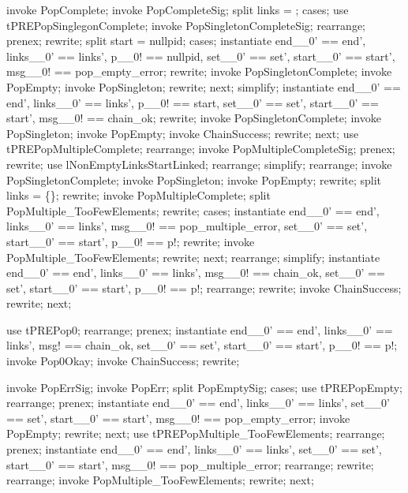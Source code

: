 \begin{forget}[tPREPopCompleteIsTotal]
invoke PopComplete;
invoke PopCompleteSig;
split links = \emptyset;
cases;
use tPREPopSinglegonComplete;
invoke PopSingletonCompleteSig;
rearrange;
prenex;
rewrite;
split start = nullpid;
cases;
instantiate end\_\_0' == end', links\_\_0' == links', p\_\_0! == nullpid, set\_\_0' == set', start\_\_0' == start', msg\_\_0! == pop\_empty\_error;
rewrite;
invoke PopSingletonComplete;
invoke PopEmpty;
invoke PopSingleton;
rewrite;
next;
simplify;
instantiate end\_\_0' == end', links\_\_0' == links', p\_\_0! == start, set\_\_0' == set', start\_\_0' == start', msg\_\_0! == chain\_ok;
rewrite;
invoke PopSingletonComplete;
invoke PopSingleton;
invoke PopEmpty;
invoke ChainSuccess;
rewrite;
next;
use tPREPopMultipleComplete;
rearrange;
invoke PopMultipleCompleteSig;
prenex;
rewrite;
use lNonEmptyLinksStartLinked;
rearrange;
simplify;
rearrange;
invoke PopSingletonComplete;
invoke PopSingleton;
invoke PopEmpty;
rewrite;
split \lnot  links = \{\};
rewrite;
invoke PopMultipleComplete;
split PopMultiple\_TooFewElements;
rewrite;
cases;
instantiate end\_\_0' == end', links\_\_0' == links', msg\_\_0! == pop\_multiple\_error, set\_\_0' == set', start\_\_0' == start', p\_\_0! == p!;
rewrite;
invoke PopMultiple\_TooFewElements;
rewrite;
next;
rearrange;
simplify;
instantiate end\_\_0' == end', links\_\_0' == links', msg\_\_0! == chain\_ok, set\_\_0' == set', start\_\_0' == start', p\_\_0! == p!;
rearrange;
rewrite;
invoke ChainSuccess;
rewrite;
next;
\end{forget}

\begin{forget}
use tPREPop0;
rearrange;
prenex;
instantiate end\_\_0' == end', links\_\_0' == links', msg! == chain\_ok, set\_\_0' == set', start\_\_0' == start', p\_\_0! == p!;
invoke Pop0Okay;
invoke ChainSuccess;
rewrite;
\end{forget}

\begin{forget}[tPREPopErr]
invoke PopErrSig;
invoke PopErr;
split PopEmptySig;
cases;
use tPREPopEmpty;
rearrange;
prenex;
instantiate end\_\_0' == end', links\_\_0' == links', set\_\_0' == set', start\_\_0' == start', msg\_\_0! == pop\_empty\_error;
invoke PopEmpty;
rewrite;
next;
use tPREPopMultiple\_TooFewElements;
rearrange;
prenex;
instantiate end\_\_0' == end', links\_\_0' == links', set\_\_0' == set', start\_\_0' == start', msg\_\_0! == pop\_multiple\_error;
rearrange;
rewrite;
rearrange;
invoke PopMultiple\_TooFewElements;
rewrite;
next;
\end{forget}

